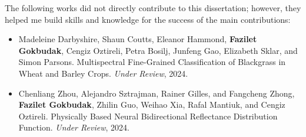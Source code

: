 The following works did not directly contribute to this dissertation; however, they helped me build skills and knowledge for the success of the main contributions:

\begin{itemize}

\item Madeleine Darbyshire, Shaun Coutts, Eleanor Hammond, \textbf{Fazilet Gokbudak}, Cengiz Oztireli, Petra Bosilj, Junfeng Gao, Elizabeth Sklar, and Simon Parsons. Multispectral Fine-Grained Classification of Blackgrass in Wheat and Barley Crops. \textit{Under Review}, 2024.

\item Chenliang Zhou, Alejandro Sztrajman, Rainer Gilles, and Fangcheng Zhong, \textbf{Fazilet Gokbudak}, Zhilin Guo, Weihao Xia, Rafal Mantiuk, and Cengiz Oztireli. Physically Based Neural Bidirectional Reflectance Distribution Function. \textit{Under Review}, 2024.

\end{itemize}